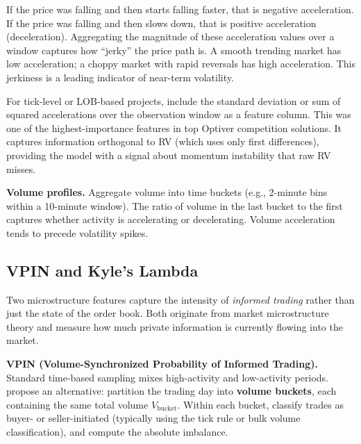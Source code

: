 \begin{intuition}
If the price was falling and then starts falling faster, that is negative acceleration. If the price was falling and then slows down, that is positive acceleration (deceleration). Aggregating the magnitude of these acceleration values over a window captures how ``jerky'' the price path is. A smooth trending market has low acceleration; a choppy market with rapid reversals has high acceleration. This jerkiness is a leading indicator of near-term volatility.
\end{intuition}

\begin{projectconnection}
For tick-level or LOB-based projects, include the standard deviation or sum of squared accelerations over the observation window as a feature column. This was one of the highest-importance features in top Optiver competition solutions. It captures information orthogonal to RV (which uses only first differences), providing the model with a signal about momentum instability that raw RV misses.
\end{projectconnection}

\textbf{Volume profiles.}
Aggregate volume into time buckets (e.g., 2-minute bins within a 10-minute window).
The ratio of volume in the last bucket to the first captures whether activity is accelerating or decelerating.
Volume acceleration tends to precede volatility spikes.

\subsection{VPIN and Kyle's Lambda}\label{sec:feat-vpin-kyle}

Two microstructure features capture the intensity of \emph{informed trading} rather than just the state of the order book.
Both originate from market microstructure theory and measure how much private information is currently flowing into the market.

\textbf{VPIN (Volume-Synchronized Probability of Informed Trading).}
Standard time-based sampling mixes high-activity and low-activity periods.
\citet{EasleyLopezOHara2012} propose an alternative: partition the trading day into \textbf{volume buckets}, each containing the same total volume $V_{\text{bucket}}$.
Within each bucket, classify trades as buyer- or seller-initiated (typically using the tick rule or bulk volume classification), and compute the absolute imbalance.

